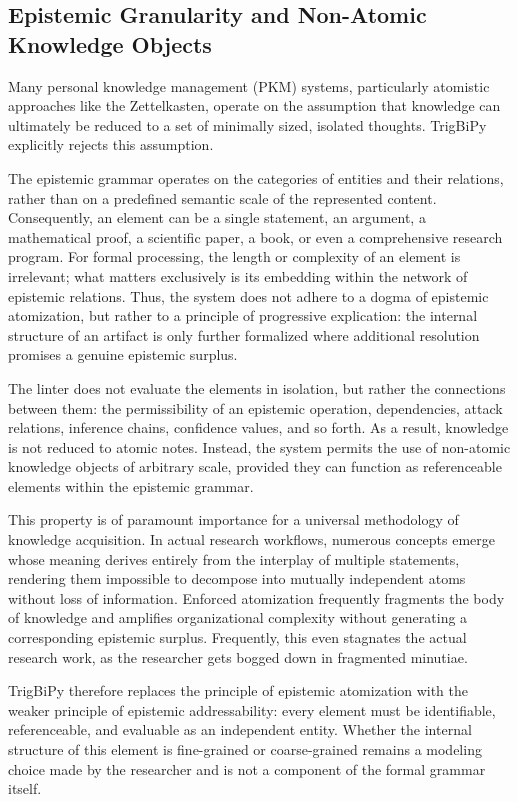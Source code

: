 \documentclass[11pt, a4paper]{article}
\begin{document}
	
	\subsection{Epistemic Granularity and Non-Atomic Knowledge Objects}
	
	Many personal knowledge management (PKM) systems, particularly atomistic approaches like the Zettelkasten, operate on the assumption that knowledge can ultimately be reduced to a set of minimally sized, isolated thoughts. TrigBiPy explicitly rejects this assumption. 
	
	The epistemic grammar operates on the categories of entities and their relations, rather than on a predefined semantic scale of the represented content. Consequently, an element can be a single statement, an argument, a mathematical proof, a scientific paper, a book, or even a comprehensive research program. For formal processing, the length or complexity of an element is irrelevant; what matters exclusively is its embedding within the network of epistemic relations. Thus, the system does not adhere to a dogma of epistemic atomization, but rather to a principle of progressive explication: the internal structure of an artifact is only further formalized where additional resolution promises a genuine epistemic surplus.
	
	The linter does not evaluate the elements in isolation, but rather the connections between them: the permissibility of an epistemic operation, dependencies, attack relations, inference chains, confidence values, and so forth. As a result, knowledge is not reduced to atomic notes. Instead, the system permits the use of non-atomic knowledge objects of arbitrary scale, provided they can function as referenceable elements within the epistemic grammar.
	
	This property is of paramount importance for a universal methodology of knowledge acquisition. In actual research workflows, numerous concepts emerge whose meaning derives entirely from the interplay of multiple statements, rendering them impossible to decompose into mutually independent atoms without loss of information. Enforced atomization frequently fragments the body of knowledge and amplifies organizational complexity without generating a corresponding epistemic surplus. Frequently, this even stagnates the actual research work, as the researcher gets bogged down in fragmented minutiae.
	
	TrigBiPy therefore replaces the principle of epistemic atomization with the weaker principle of epistemic addressability: every element must be identifiable, referenceable, and evaluable as an independent entity. Whether the internal structure of this element is fine-grained or coarse-grained remains a modeling choice made by the researcher and is not a component of the formal grammar itself.
	
\end{document}
